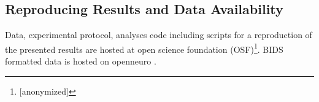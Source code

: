 



\subsection{Reproducing Results and Data Availability}
Data, experimental protocol, analyses code including scripts for a reproduction of the presented results are hosted at open science foundation (OSF)\footnote{[anonymized]}. BIDS formatted data is hosted on openneuro \cite{}.